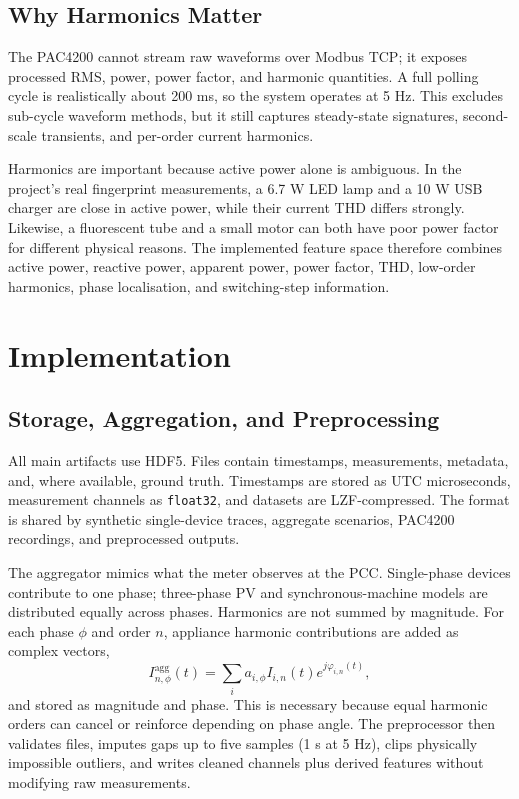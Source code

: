 \documentclass[letterpaper,journal]{IEEEtran}
\begin{document}
\subsection{Why Harmonics Matter}

The PAC4200 cannot stream raw waveforms over Modbus TCP; it exposes processed RMS, power, power factor, and harmonic quantities. A full polling cycle is realistically about 200 ms, so the system operates at 5 Hz. This excludes sub-cycle waveform methods, but it still captures steady-state signatures, second-scale transients, and per-order current harmonics.

Harmonics are important because active power alone is ambiguous. In the project's real fingerprint measurements, a 6.7 W LED lamp and a 10 W USB charger are close in active power, while their current THD differs strongly. Likewise, a fluorescent tube and a small motor can both have poor power factor for different physical reasons. The implemented feature space therefore combines active power, reactive power, apparent power, power factor, THD, low-order harmonics, phase localisation, and switching-step information.

\section{Implementation}

\subsection{Storage, Aggregation, and Preprocessing}

All main artifacts use HDF5. Files contain timestamps, measurements, metadata, and, where available, ground truth. Timestamps are stored as UTC microseconds, measurement channels as \texttt{float32}, and datasets are LZF-compressed. The format is shared by synthetic single-device traces, aggregate scenarios, PAC4200 recordings, and preprocessed outputs.

The aggregator mimics what the meter observes at the PCC. Single-phase devices contribute to one phase; three-phase PV and synchronous-machine models are distributed equally across phases. Harmonics are not summed by magnitude. For each phase $\phi$ and order $n$, appliance harmonic contributions are added as complex vectors,
\begin{equation}
    I_{n,\phi}^{\mathrm{agg}}(t) =
    \sum_i a_{i,\phi} I_{i,n}(t)e^{j\varphi_{i,n}(t)} ,
\end{equation}
and stored as magnitude and phase. This is necessary because equal harmonic orders can cancel or reinforce depending on phase angle. The preprocessor then validates files, imputes gaps up to five samples (1 s at 5 Hz), clips physically impossible outliers, and writes cleaned channels plus derived features without modifying raw measurements.
\end{document}
